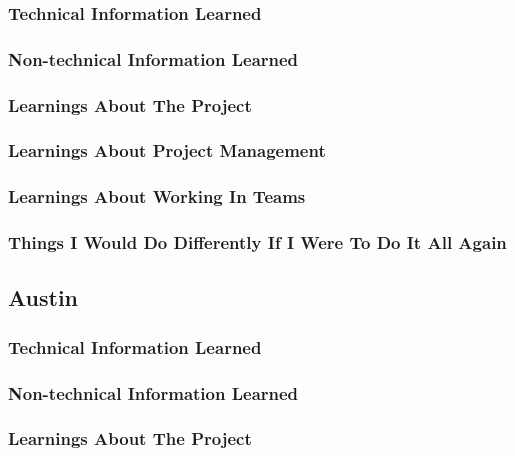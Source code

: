 \documentclass[onecolumn, draftclsnofoot,10pt, compsoc]{IEEEtran}
\begin{document}
	\subsubsection{Technical Information Learned}
	
	
	
	\subsubsection{Non-technical Information Learned}
	
	


	\subsubsection{Learnings About The Project}
	
	
	
	
	\subsubsection{Learnings About Project Management}




	\subsubsection{Learnings About Working In Teams}




	\subsubsection{Things I Would Do Differently If I Were To Do It All Again}






\subsection{Austin}
\subsubsection{Technical Information Learned}



\subsubsection{Non-technical Information Learned}




\subsubsection{Learnings About The Project}
\end{document}
